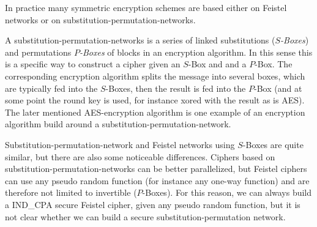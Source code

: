  In practice many symmetric encryption schemes are based either on Feistel networks or on substitution-permutation-networks. %
 \begin{definition}
  A substitution-permutation-networks is a series of linked substitutions (\emph{$S$-Boxes}) and permutations \emph{$P$-Boxes} of blocks in an encryption algorithm. 
  In this sense this is a specific way to construct a cipher given an $S$-Box and and a $P$-Box. 
  The corresponding encryption algorithm splits the message into several boxes, which are typically fed into the $S$-Boxes, then the result is fed into the $P$-Box (and at some point the round key is used, for instance xored with the result as is AES). The later mentioned AES-encryption algorithm is one example of an encryption algorithm build around a substitution-permutation-network.
 \end{definition}
 Substitution-permutation-network and Feistel networks using $S$-Boxes are quite similar, but there are also some noticeable differences. Ciphers based on substitution-permutation-networks can be better parallelized, but Feistel ciphers can use any pseudo random function (for instance any one-way function) and are therefore not limited to invertible ($P$-Boxes). 
 For this reason, we can always build a IND\_CPA secure Feistel cipher, given any pseudo random function, but it is not clear whether we can build a secure substitution-permutation network.%

